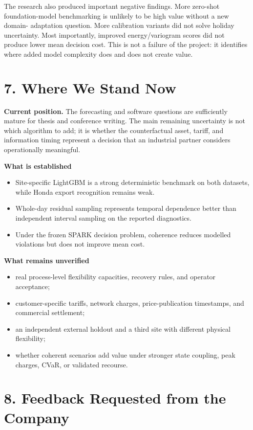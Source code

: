 \documentclass[10pt,a4paper]{article}
\newcommand{\infobox}[2]{%
  \begin{center}
  \colorbox{#1}{\begin{minipage}{0.95\textwidth}\small #2\end{minipage}}
  \end{center}}
\begin{document}
The research also produced important negative findings. More zero-shot
foundation-model benchmarking is unlikely to be high value without a new domain-
adaptation question. More calibration variants did not solve holiday uncertainty.
Most importantly, improved energy/variogram scores did not produce lower mean
decision cost. This is not a failure of the project: it identifies where added
model complexity does and does not create value.

\section*{7. Where We Stand Now}

\infobox{amberbox}{\textbf{Current position.} The forecasting and software
questions are sufficiently mature for thesis and conference writing. The main
remaining uncertainty is not which algorithm to add; it is whether the
counterfactual asset, tariff, and information timing represent a decision that
an industrial partner considers operationally meaningful.}

\textbf{What is established}
\begin{itemize}
  \item Site-specific LightGBM is a strong deterministic benchmark on both
  datasets, while Honda export recognition remains weak.
  \item Whole-day residual sampling represents temporal dependence better than
  independent interval sampling on the reported diagnostics.
  \item Under the frozen SPARK decision problem, coherence reduces modelled
  violations but does not improve mean cost.
\end{itemize}

\textbf{What remains unverified}
\begin{itemize}
  \item real process-level flexibility capacities, recovery rules, and operator
  acceptance;
  \item customer-specific tariffs, network charges, price-publication timestamps,
  and commercial settlement;
  \item an independent external holdout and a third site with different physical
  flexibility;
  \item whether coherent scenarios add value under stronger state coupling,
  peak charges, CVaR, or validated recourse.
\end{itemize}

\section*{8. Feedback Requested from the Company}
\end{document}
